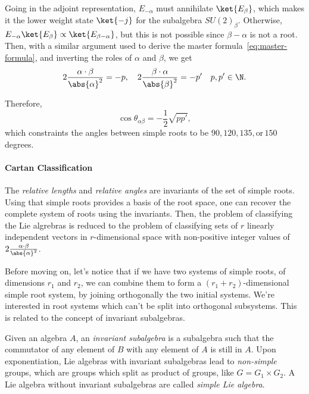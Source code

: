 Going in the adjoint representation, $E_{-\alpha}$ must annihilate $\ket{E_\beta}$, which makes it the lower weight state $\ket{-j}$ for the subalgebra $SU(2)_\beta$. Otherwise, $E_{-\alpha} \ket{E_\beta} \propto \ket{E_{\beta - \alpha}}$, but this is not possible since $\beta - \alpha$ is not a root. Then, with a similar argument used to derive the master formula~\eqref{eq:master-formula}, and inverting the roles of $\alpha$ and $\beta$, we get
\begin{equation}
    2 \frac{\alpha \cdot \beta}{\abs{\alpha}^2} = - p, \quad 2 \frac{\beta \cdot \alpha}{\abs{\beta}^2} = -p'  \quad p,p' \in \N .
\end{equation}

Therefore,
\begin{equation}\label{appeq:cosine}
    \cos \theta_{\alpha\beta} = -\frac{1}{2} \sqrt{pp'},
\end{equation}
which constraints the angles between simple roots to be $90,120,135,\text{or}\,150$ degrees.

\paragraph{Cartan Classification}
The \emph{relative lengths} and \emph{relative angles} are invariants of the set of simple roots. Using that simple roots provides a basis of the root space, one can recover the complete system of roots using the invariants. Then, the problem of classifying the Lie algrebras is reduced to the problem of classifying sets of $r$ linearly independent vectors in $r$-dimensional space with non-positive integer values of $2\frac{\alpha \cdot \beta}{\abs{\alpha}^2}$.

Before moving on, let's notice that if we have two systems of simple roots, of dimensions $r_1$ and $r_2$, we can combine them to form a $(r_1 + r_2)$-dimensional simple root system, by joining orthogonally the two initial systems. We're interested in root systems which can't be split into orthogonal subsystems. This is related to the concept of invariant subalgebras.

Given an algebra $A$, an \emph{invariant subalgebra} is a subalgebra such that the commutator of any element of $B$ with any element of $A$ is still in $A$. Upon exponentiation, Lie algebras with invariant subalgebras lead to \emph{non-simple} groups, which are groups which split as product of groups, like $G = G_1 \times G_2$. A Lie algebra without invariant subalgebras are called \emph{simple Lie algebra}.

